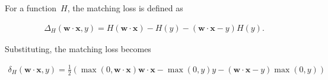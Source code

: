 \documentclass{report}
\newcommand{\w}{\mathbf{w}}
\newcommand{\xvec}{\mathbf{x}}
\newcommand{\wx}{\w\cdot\xvec}
\begin{document}
  For a function~$H$, the matching loss is defined as
  
  \begin{align}
    \Delta_{H}(\wx, y) = H(\wx) - H(y) - (\wx - y)H(y)\textrm{.}
  \end{align}

  Substituting, the matching loss becomes
  
  \begin{align}
    \delta_{H}(\wx, y) = \frac{1}{2}\left( \max(0,\wx)\wx - \max(0,y)y - (\wx -y)\max(0,y) \right)
  \end{align}
\end{document}
